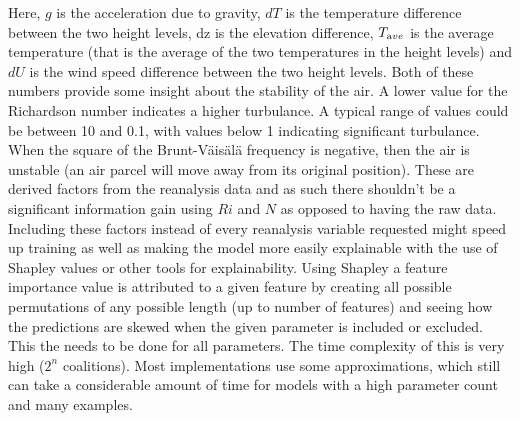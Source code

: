 Here, $g$ is the acceleration due to gravity, $dT$ is the temperature difference between the two height levels, dz is the elevation difference, $T_{\textrm ave}$ is the average temperature (that is the average of the two temperatures in the height levels) and $dU$ is the wind speed difference between the two height levels. Both of these numbers provide some insight about the stability of the air. A lower value for the Richardson number indicates a higher turbulance. A typical range of values could be between 10 and 0.1, with values below 1 indicating significant turbulance\cite{richardson_number_skybrary}. When the square of the Brunt-Väisälä frequency is negative, then the air is unstable (an air parcel will move away from its original position)\cite{brunt_vaisala_freq_eumtrain}. These are derived factors from the reanalysis data and as such there shouldn't be a significant information gain using $Ri$ and $N$ as opposed to having the raw data. Including these factors instead of every reanalysis variable requested might speed up training as well as making the model more easily explainable with the use of Shapley values or other tools for explainability. Using Shapley a feature importance value is attributed to a given feature by creating all possible permutations of any possible length (up to number of features) and seeing how the predictions are skewed when the given parameter is included or excluded. This the needs to be done for all parameters. The time complexity of this is very high ($2^n$ coalitions)\cite{shapley_information}. Most implementations use some approximations, which still can take a considerable amount of time for models with a high parameter count and many examples.


